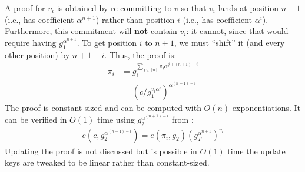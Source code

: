 A proof for $v_i$ is obtained by re-committing to $v$ so that $v_i$ lands at position $n+1$ (i.e., has coefficient $\alpha^{n+1}$) rather than position $i$ (i.e., has coefficient $\alpha^i$).
Furthermore, this commitment will \textbf{not} contain $v_i$: it cannot, since that would require having $g_1^{\alpha^{n+1}}$.
To get position $i$ to $n+1$, we must ``shift'' it (and every other position) by $n + 1 - i$.
Thus, the proof is:
\begin{align}
\pi_i &= g_1^{\sum_{j\in[n]} v_j \alpha^{j + (n+1) - i}}\\
      &= (c / g_1^{v_i \alpha^i})^{\alpha^{(n+1) - i}}
\end{align}
The proof is constant-sized and can be computed with $O(n)$ exponentiations.
It can be verified in $O(1)$ time using $g_2^{\alpha^{(n+1) - i}}$ from \vrk:
\begin{align}
e(c, g_2^{\alpha^{(n+1)-i}})=e(\pi_i, g_2) \left(g_T^{\alpha^{n+1}}\right)^{v_i}
\end{align}
Updating the proof is not discussed but is possible in $O(1)$ time the update keys are tweaked to be linear rather than constant-sized.

